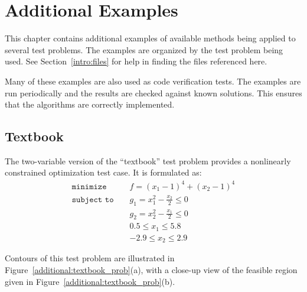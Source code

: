\chapter{Additional Examples}\label{additional}

This chapter contains additional examples of available methods being applied 
to several test problems. The examples are organized by the test problem
being used. See Section~\ref{intro:files} for help in finding the files referenced
here.

Many of these examples are also used as code verification tests. The examples are
run periodically and the results are checked against known solutions. This 
ensures that the algorithms are correctly implemented. 

\section{Textbook}\label{additional:textbook}

The two-variable version of the ``textbook'' test problem provides
a nonlinearly constrained optimization test case. It is formulated as:
\begin{eqnarray}
\texttt{minimize }
& & f = (x_1-1)^{4}+(x_2-1)^{4}     \nonumber \\
\texttt{subject to }
& & g_1 = x_1^2-\frac{x_2}{2} \le 0 \nonumber \\
& & g_2 = x_2^2-\frac{x_1}{2} \le 0 \label{additional:textbook_f} \\
& &  0.5 \le x_1 \le 5.8            \nonumber \\
& & -2.9 \le x_2 \le 2.9            \nonumber
\end{eqnarray}

Contours of this test problem are illustrated in
Figure~\ref{additional:textbook_prob}(a), with a close-up view of
the feasible region given in
Figure~\ref{additional:textbook_prob}(b).


